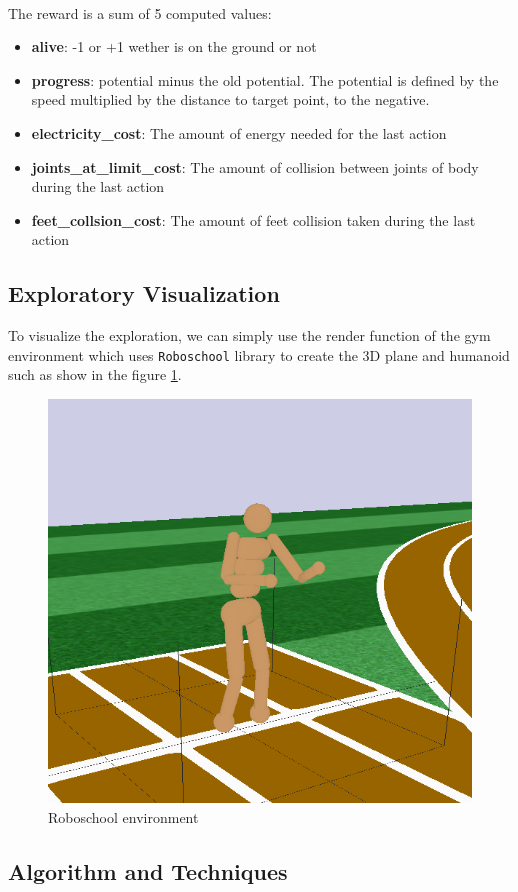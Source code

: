 \documentclass{article}
\begin{document}
\paragraph{}
The reward is a sum of 5 computed values: \begin{itemize}
  \item{\textbf{alive}: -1 or +1 wether is on the ground or not}
  \item{\textbf{progress}: potential minus the old potential. The potential is defined by
    the speed multiplied by the distance to target point, to the negative.}
  \item{\textbf{electricity\_cost}: The amount of energy needed for the last action}
  \item{\textbf{joints\_at\_limit\_cost}: The amount of collision between joints of body
      during the last action}
  \item{\textbf{feet\_collsion\_cost}: The amount of feet collision taken during the last action}
  \end{itemize}

\subsection{Exploratory Visualization}

To visualize the exploration, we can simply use the render function of the gym
environment which uses \verb?Roboschool? library to create the 3D plane and
humanoid such as show in the figure \ref{fig:roboschoolhumanoid}.  

\begin{figure}[ht]
  \centering
  \includegraphics[width=.5\textwidth]{roboschoolhumanoid}
  \caption{Roboschool environment}
  \label{fig:roboschoolhumanoid}
\end{figure}

\subsection{Algorithm and Techniques}
\end{document}
